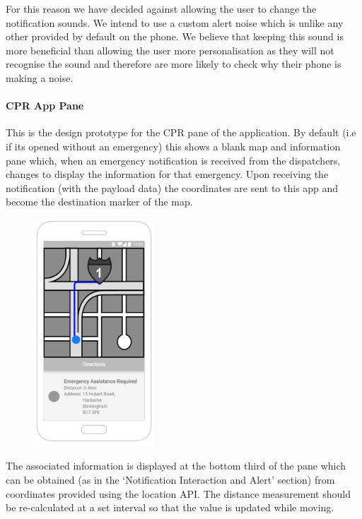\documentclass{article}
\begin{document}
For this reason we have decided against allowing the user to change the notification sounds. We intend to use a custom alert noise which is unlike any other provided by default on the phone. We believe that keeping this sound is more beneficial than allowing the user more personalisation as they will not recognise the sound and therefore are more likely to check why their phone is making a noise.\\

\pagebreak
\paragraph{CPR App Pane}
This is the design prototype for the CPR pane of the application. By default (i.e if its opened without an emergency) this shows a blank map and information pane which, when an emergency notification is received from the dispatchers, changes to display the information for that emergency. Upon receiving the notification (with the payload data) the coordinates are sent to this app and become the destination marker of the map.\\

\begin{figure}
  \begin{center}
		\includegraphics[width=0.4\textwidth]{"Iteration1/Android CPR app pane"}  \end{center}
\end{figure}
The associated information is displayed at the bottom third of the pane which can be obtained (as in the ‘Notification Interaction and Alert’ section) from coordinates provided using the location API. The distance measurement should be re-calculated at a set interval so that the value is updated while moving.\\
\end{document}
